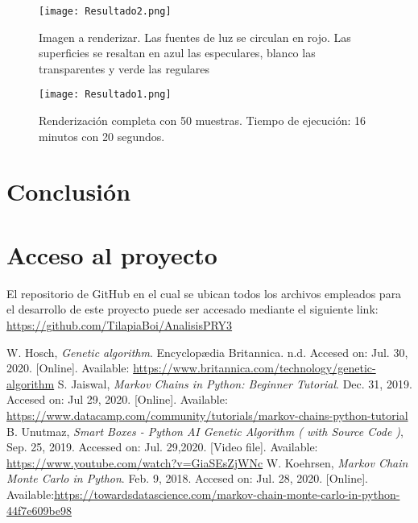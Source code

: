 \documentclass[conference]{IEEEtran}
\begin{document}
\begin{figure}[htbp]
\centerline{\texttt{[image: Resultado2.png]}}
\caption{Imagen a renderizar. Las fuentes de luz se circulan en rojo. Las superficies se resaltan en azul las especulares, blanco las transparentes y verde las regulares}
\label{Imagen de referencia}
\end{figure}


\begin{figure}[htbp]
\centerline{\texttt{[image: Resultado1.png]}}
\caption{Renderización completa con 50 muestras. Tiempo de ejecución: 16 minutos con 20 segundos.}
\label{50 muestras completo}
\end{figure}


\section{Conclusión}


\section{Acceso al proyecto}
El repositorio de GitHub en el cual se ubican todos los archivos empleados para el desarrollo de este proyecto puede ser accesado mediante el siguiente link: \url{https://github.com/TilapiaBoi/AnalisisPRY3}

\begin{thebibliography}{00}
 W. Hosch, \textit{Genetic algorithm}. Encyclopædia Britannica. n.d. Accesed on: Jul. 30, 2020. [Online]. Available: \url{https://www.britannica.com/technology/genetic-algorithm}
 S. Jaiswal, \textit{Markov Chains in Python: Beginner Tutorial}. Dec. 31, 2019. Accesed on: Jul 29, 2020. [Online]. Available: \url{https://www.datacamp.com/community/tutorials/markov-chains-python-tutorial}
 B. Unutmaz, \textit{Smart Boxes - Python AI Genetic Algorithm ( with Source Code )}, Sep. 25, 2019. Accessed on: Jul. 29,2020. [Video file]. Available: \url{ https://www.youtube.com/watch?v=GiaSEsZjWNc}
 W. Koehrsen, \textit{Markov Chain Monte Carlo in Python}. Feb. 9, 2018. Accesed on: Jul. 28, 2020. [Online]. Available:\url{https://towardsdatascience.com/markov-chain-monte-carlo-in-python-44f7e609be98}
\end{thebibliography}
\end{document}
